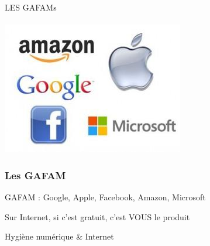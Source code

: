 \documentclass{beamer}
\begin{document}
\begin{frame}
\begin{center}
\Huge{LES GAFAMs}\\~\\
\includegraphics[scale=0.5] {./images/gafam.jpg} 
\end{center}
\end{frame}

\begin{frame}
\frametitle{Les GAFAM}
\begin{block}{GAFAM : Google, Apple, Facebook, Amazon, Microsoft}
\begin{itemize}
\end{itemize}
\end{block}
\end{frame}

\begin{frame}
\begin{center}
\Huge{Sur Internet, si c'est gratuit, c'est VOUS le produit}
\end{center}
\end{frame}

\begin{frame}
\begin{center}
\Huge{Hygiène numérique \& Internet}
\end{center}
\end{frame}
\end{document}
